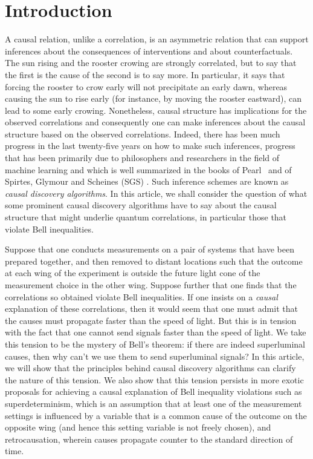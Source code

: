 \documentclass[12pt,onecolumn,nofootinbib]{revtex4-2}
\begin{document}
\section{Introduction}
\label{sec:intro}

A causal relation, unlike a correlation, is an asymmetric relation that can
support inferences about the consequences of interventions and about
counterfactuals. The sun rising and the rooster crowing are strongly
correlated, but to say that the first is the cause of the second is to say
more. In particular, it says that forcing the rooster to crow early will not
precipitate an early dawn, whereas causing the sun to rise early (for
instance, by moving the rooster eastward), can lead to some early crowing.
Nonetheless, causal structure has implications for the observed correlations
and consequently one can make inferences about the causal structure based on
the observed correlations. Indeed, there has been much progress in the
last twenty-five years on how to make such inferences, progress that has
been primarily due to philosophers and researchers in the field of machine
learning and which is well summarized in the books of Pearl~\cite{Pearl2009} and of Spirtes, Glymour
and Scheines (SGS) \cite{Spirtes2001}. Such inference schemes are known
as \emph{causal discovery algorithms}. In this article, we shall consider
the question of what some prominent causal discovery algorithms have to say about
the causal structure that might underlie quantum correlations, in particular
those that violate Bell inequalities.

Suppose that one conducts measurements on a pair of systems that have been
prepared together, and then removed to distant locations such that the
outcome at each wing of the experiment is outside the future light cone of
the measurement choice in the other wing. Suppose further that one finds that the
correlations so obtained violate Bell inequalities.  If one insists on a \emph{causal} explanation of these correlations, then it would seem that one must admit that the causes must propagate faster than the speed of light. But this is in tension with the fact that one cannot send signals faster than the speed of light. We take this tension to be the mystery of Bell's theorem: if there are indeed
superluminal causes, then why can't we use them to send superluminal
signals? In this article, we will show that the principles behind causal
discovery algorithms can clarify the nature of this tension.  We also show that this tension persists in more exotic proposals for achieving a causal explanation of Bell inequality violations such as superdeterminism, which is an assumption that at least one of the measurement settings is influenced by a variable that is a common cause of the outcome on the opposite wing (and hence this setting variable is not freely chosen), and retrocausation, wherein causes propagate counter to the standard direction of time.
\end{document}

